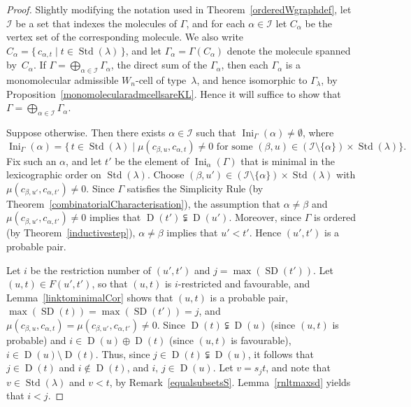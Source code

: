 \documentclass[ALCO,ThmDefs,Unicode,epreuves]{cedram}
\DeclareMathOperator{\Ini}{Ini}
\DeclareMathOperator{\STD}{Std}
\DeclareMathOperator{\SD}{SD}
\DeclareMathOperator{\D}{D}
\begin{document}
\begin{proof}
Slightly modifying the notation used in Theorem~\ref{orderedWgraphdef},
let $\mathcal{I}$ be a set that indexes the molecules of $\Gamma$, and for
each $\alpha\in\mathcal{I}$ let $C_\alpha$ be the vertex set of the corresponding molecule.
We also write $C_\alpha=\{\,c_{\alpha,t}\mid t\in\STD(\lambda)\,\}$, and let
$\Gamma_\alpha=\Gamma(C_\alpha)$
denote the molecule spanned by~$C_\alpha$.
If $\Gamma = \bigoplus_{\alpha\in\mathcal{I}}\Gamma_\alpha$, the direct sum of
the $\Gamma_\alpha$, then each $\Gamma_\alpha$ is a monomolecular admissible
$W_n$-cell of type~$\lambda$, and hence isomorphic to
$\Gamma_{\lambda}$, by
Proposition~\ref{monomolecularadmcellsareKL}. Hence it will suffice to show
that $\Gamma = \bigoplus_{\alpha\in\mathcal{I}}\Gamma_\alpha$.

Suppose otherwise. Then there exists $\alpha\in\mathcal{I}$ such that
$\Ini_\Gamma(\alpha)\ne\emptyset$, where
\begin{equation*}
\Ini_{\Gamma}(\alpha)=\{\,t\in\STD(\lambda)\mid\mu(c_{\beta,u},c_{\alpha,t})\neq 0
\text{ for some }(\beta,u)\in(\mathcal{I}\setminus\{\alpha\})\times\STD(\lambda)\}.
\end{equation*}
Fix such an $\alpha$, and let $t'$ be the element of $\Ini_{\alpha}(\Gamma)$
that is minimal in the lexicographic order on $\STD(\lambda)$. Choose
$(\beta,u')\in (\mathcal{I}\setminus \{\alpha\})\times\STD(\lambda)$ with
$\mu(c_{\beta,u'},c_{\alpha,t'})\neq 0$. Since
$\Gamma$ satisfies the Simplicity Rule (by
Theorem~\ref{combinatorialCharacterisation}), the assumption that
$\alpha\neq\beta$ and $\mu(c_{\beta,u'},c_{\alpha,t'})\neq 0$ implies that
$\D(t')\subsetneqq\D(u')$. Moreover, since $\Gamma$ is ordered (by Theorem~\ref{inductivestep}),
$\alpha\neq\beta$ implies that $u'<t'$. Hence $(u',t')$ is a probable pair.

Let $i$ be the restriction number of $(u',t')$ and
$j=\max(\SD(t'))$. Let $(u,t)\in F(u',t')$, so that $(u,t)$ is
$i$-restricted and favourable, and Lemma~\ref{linktominimalCor} shows that
$(u,t)$ is a probable pair, $\max(\SD(t))=\max(\SD(t'))=j$,
and $\mu(c_{\beta,u},c_{\alpha,t})=\mu(c_{\beta,u'},c_{\alpha,t'})\neq 0$.
Since $\D(t)\subsetneqq\D(u)$ (since $(u,t)$ is probable) and $i\in\D(u)\oplus\D(t)$
(since $(u,t)$ is favourable), $i\in\D(u)\setminus\D(t)$.
Thus, since $j\in\D(t)\subsetneqq\D(u)$, it follows that
$j\in\D(t)$ and $i\notin\D(t)$, and
$i,\,j\in\D(u)$. Let $v=s_jt$,
and note that $v\in\STD(\lambda)$ and $v<t$, by Remark~\ref{equalsubsetsS}.
Lemma~\ref{rnltmaxsd} yields that $i<j$.


\end{proof}
\end{document}

